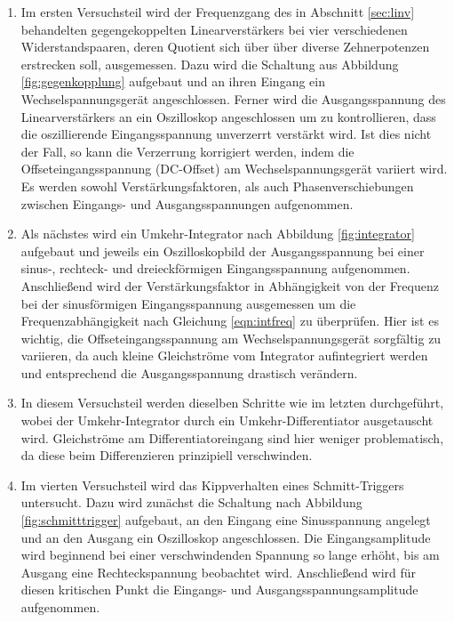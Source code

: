 \begin{enumerate}
  \item Im ersten Versuchsteil wird der Frequenzgang des in Abschnitt \ref{sec:linv} behandelten gegengekoppelten
  Linearverstärkers bei vier verschiedenen Widerstandspaaren, deren Quotient sich über über diverse
  Zehnerpotenzen erstrecken soll, ausgemessen. Dazu wird die Schaltung aus Abbildung \ref{fig:gegenkopplung} aufgebaut
  und an ihren Eingang ein Wechselspannungsgerät angeschlossen. Ferner wird die Ausgangsspannung des Linearverstärkers
  an ein Oszilloskop angeschlossen um zu kontrollieren, dass die oszillierende Eingangsspannung unverzerrt
  verstärkt wird. Ist dies nicht der Fall, so kann die Verzerrung korrigiert werden, indem die
  Offseteingangsspannung (DC-Offset) am Wechselspannungsgerät variiert wird. Es werden sowohl Verstärkungsfaktoren,
  als auch Phasenverschiebungen zwischen Eingangs- und Ausgangsspannungen aufgenommen.

  \item Als nächstes wird ein Umkehr-Integrator nach Abbildung \ref{fig:integrator} aufgebaut und jeweils ein
  Oszilloskopbild der Ausgangsspannung bei einer sinus-, rechteck- und dreieckförmigen Eingangsspannung aufgenommen.
  Anschließend wird der Verstärkungsfaktor in Abhängigkeit von der Frequenz bei der sinusförmigen Eingangsspannung
  ausgemessen um die Frequenzabhängigkeit nach Gleichung \eqref{eqn:intfreq} zu überprüfen.
  Hier ist es wichtig, die Offseteingangsspannung am Wechselspannungsgerät sorgfältig zu variieren, da
  auch kleine Gleichströme vom Integrator aufintegriert werden und entsprechend die Ausgangsspannung
  drastisch verändern.

  \item In diesem Versuchsteil werden dieselben Schritte wie im letzten durchgeführt, wobei der Umkehr-Integrator
  durch ein Umkehr-Differentiator ausgetauscht wird.
  Gleichströme am Differentiatoreingang sind hier weniger problematisch, da diese beim Differenzieren prinzipiell
  verschwinden.

  \item Im vierten Versuchsteil wird das Kippverhalten eines Schmitt-Triggers untersucht. Dazu wird
  zunächst die Schaltung nach Abbildung \ref{fig:schmitttrigger} aufgebaut, an den Eingang eine
  Sinusspannung angelegt und an den Ausgang ein Oszilloskop angeschlossen. Die Eingangsamplitude
  wird beginnend bei einer verschwindenden Spannung so lange erhöht, bis am Ausgang eine Rechteckspannung
  beobachtet wird. Anschließend wird für diesen kritischen Punkt die Eingangs- und Ausgangsspannungsamplitude
  aufgenommen.


\end{enumerate}
